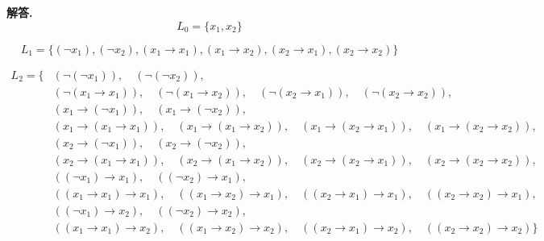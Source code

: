 \documentclass[10pt, a4paper, oneside]{ctexart}
\newenvironment{solution}{\par\noindent\textbf{解答. }}{\par}
\begin{document}
\begin{solution}
$$
L_0 = \{ x_1, x_2 \}
$$

$$
L_1 = \{ (\lnot x_1), (\lnot x_2), (x_1 \to x_1), (x_1 \to x_2), (x_2 \to x_1), (x_2 \to x_2) \}
$$

\begin{align*}
L_2 = \{
    & (\lnot (\lnot x_1)), \quad (\lnot (\lnot x_2)), \\
    & (\lnot (x_1 \to x_1)), \quad (\lnot (x_1 \to x_2)), \quad (\lnot (x_2 \to x_1)), \quad (\lnot (x_2 \to x_2)), \\
    & (x_1 \to (\lnot x_1)), \quad (x_1 \to (\lnot x_2)), \\
    & (x_1 \to (x_1 \to x_1)), \quad (x_1 \to (x_1 \to x_2)), \quad (x_1 \to (x_2 \to x_1)), \quad (x_1 \to (x_2 \to x_2)), \\
    & (x_2 \to (\lnot x_1)), \quad (x_2 \to (\lnot x_2)), \\
    & (x_2 \to (x_1 \to x_1)), \quad (x_2 \to (x_1 \to x_2)), \quad (x_2 \to (x_2 \to x_1)), \quad (x_2 \to (x_2 \to x_2)), \\
    & ((\lnot x_1) \to x_1), \quad ((\lnot x_2) \to x_1), \\
    & ((x_1 \to x_1) \to x_1), \quad ((x_1 \to x_2) \to x_1), \quad ((x_2 \to x_1) \to x_1), \quad ((x_2 \to x_2) \to x_1), \\
    & ((\lnot x_1) \to x_2), \quad ((\lnot x_2) \to x_2), \\
    & ((x_1 \to x_1) \to x_2), \quad ((x_1 \to x_2) \to x_2), \quad ((x_2 \to x_1) \to x_2), \quad ((x_2 \to x_2) \to x_2) 
\}
\end{align*}

\end{solution}
\end{document}
